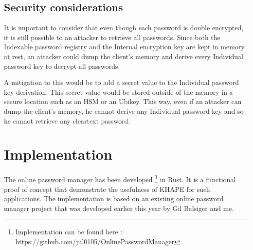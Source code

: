 \documentclass[../report.tex]{subfiles}
\begin{document}
\subsection{Security considerations}

It is important to consider that even though each password is double encrypted, it is still possible to an attacker to retrieve all passwords. Since both the Indexable password registry and the Internal encryption key are kept in memory at rest, an attacker could dump the client's memory and derive every Individual password key to decrypt all passwords.

A mitigation to this would be to add a secret value to the Individual password key derivation. This secret value would be stored outside of the memory in a secure location such as an HSM or an Ubikey. This way, even if an attacker can dump the client's memory, he cannot derive any Individual password key and so he cannot retrieve any cleartext password. 




% 
% 
% 


\section{Implementation}

% 



The online password manager has been developed \footnote{Implementation can be found here : https://github.com/jul0105/OnlinePasswordManager} in Rust. It is a functional proof of concept that demonstrate the usefulness of KHAPE for such applications.
The implementation is based on an existing online password manager project that was developed earlier this year by Gil Balsiger and me.
\end{document}
